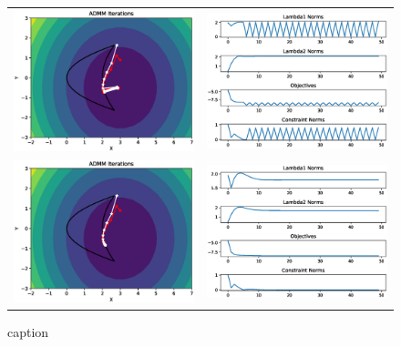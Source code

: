 \documentclass{article}
\begin{document}
\begin{figure}
\begin{tabular}{cc}
  \includegraphics[width=80mm]{figures/toy_admm_iterations_2.eps} &   \includegraphics[width=80mm]{figures/toy_admm_norms_2.eps} \\
 \includegraphics[width=85mm]{figures/toy_ali_iterations_2.eps} &   \includegraphics[width=85mm]{figures/toy_ali_norms_2.eps} \\
\end{tabular}
\caption{caption}
\label{fig:quad_trajectories}
\end{figure}
\end{document}
